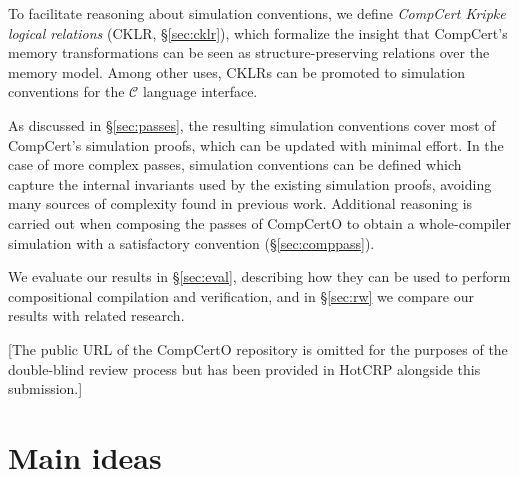 \documentclass[acmsmall,authordraft]{acmart}
\begin{document}
To facilitate reasoning about
simulation conventions,
we define \emph{CompCert Kripke logical relations}
(CKLR, \S\ref{sec:cklr}),
which formalize the insight that
CompCert's memory transformations can be seen
as structure-preserving relations
over the memory model.
Among other uses,
CKLRs can be promoted to
simulation conventions for the $\mathcal{C}$
language interface.

As discussed in \S\ref{sec:passes},
the resulting simulation conventions
cover most of CompCert's simulation proofs,
which can be updated with minimal effort.
In the case of more complex passes,
simulation conventions can be defined
which capture the internal invariants
used by the existing simulation proofs,
avoiding many sources of complexity found
in previous work.
Additional reasoning is carried out
when composing the passes of CompCertO
to obtain a whole-compiler simulation
with a satisfactory convention (\S\ref{sec:comppass}).

We evaluate our results in \S\ref{sec:eval},
describing how they
can be used to perform compositional compilation and verification,
and in \S\ref{sec:rw} we compare our results with related research.

[The public URL of the CompCertO repository is omitted
for the purposes of the double-blind review process
but has been provided in HotCRP alongside this submission.]



\section{Main ideas} \label{sec:mainideas} %
\end{document}
